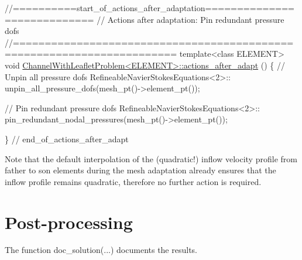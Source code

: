 \begin{DoxyCodeInclude}
\textcolor{comment}{//==========start\_of\_actions\_after\_adaptation============================}
\textcolor{comment}{// Actions after adaptation: Pin redundant pressure dofs}
\textcolor{comment}{//=======================================================================}
\textcolor{keyword}{template}<\textcolor{keyword}{class} ELEMENT>
\textcolor{keywordtype}{void} \hyperlink{classChannelWithLeafletProblem_a7978755f073d950e5012951ced9e455e}{ChannelWithLeafletProblem<ELEMENT>::actions\_after\_adapt}
      ()
\{
 \textcolor{comment}{// Unpin all pressure dofs}
 RefineableNavierStokesEquations<2>::
  unpin\_all\_pressure\_dofs(mesh\_pt()->element\_pt());
 
 \textcolor{comment}{// Pin redundant pressure dofs}
 RefineableNavierStokesEquations<2>::
  pin\_redundant\_nodal\_pressures(mesh\_pt()->element\_pt());
 
\} \textcolor{comment}{// end\_of\_actions\_after\_adapt}

\end{DoxyCodeInclude}


Note that the default interpolation of the (quadratic!) inflow velocity profile from father to son elements during the mesh adaptation already ensures that the inflow profile remains quadratic, therefore no further action is required.



 

\hypertarget{index_doc}{}\section{Post-\/processing}\label{index_doc}
The function {\ttfamily doc\+\_\+solution}(...) documents the results.


